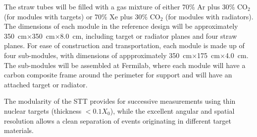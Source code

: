 The straw tubes will be filled with a gas mixture of either 70\% Ar
plus 30\% CO$_2$ (for modules with targets) or 70\% Xe plus 30\%
CO$_2$ (for modules with radiators).  The dimensions of each module in
the reference design will be approximately
350~cm$\times$350~cm$\times$8.0~cm, including target or radiator
planes and four straw planes. For ease of construction and
transportation, each module is made up of four sub-modules, with
dimensions of appproximately 350~cm$\times$175~cm$\times$4.0~cm.
The sub-modules will be assembled %
at Fermilab, where each module will have a carbon composite frame around 
the perimeter for support and will have an attached target or 
radiator. 

The modularity of the STT provides for successive measurements using
thin nuclear targets (thickness $< 0.1 X_0$), while the excellent
angular and spatial resolution allows a clean separation of events
originating in different target materials.

